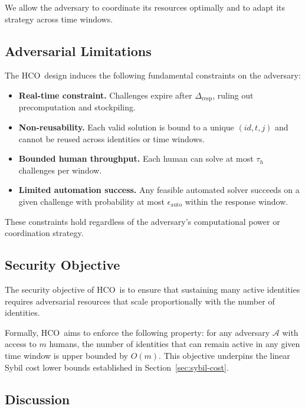 \documentclass[11pt]{article}
\newcommand{\HCO}{HCO\xspace}
\begin{document}
We allow the adversary to coordinate its resources optimally and to adapt its strategy across time windows.

\subsection{Adversarial Limitations}

The \HCO\ design induces the following fundamental constraints on the adversary:
\begin{itemize}
	\item \textbf{Real-time constraint.}
	Challenges expire after $\Delta_{\mathrm{resp}}$, ruling out precomputation and stockpiling.
	
	\item \textbf{Non-reusability.}
	Each valid solution is bound to a unique $(id, t, j)$ and cannot be reused across identities or time windows.
	
	\item \textbf{Bounded human throughput.}
	Each human can solve at most $\tau_h$ challenges per window.
	
	\item \textbf{Limited automation success.}
	Any feasible automated solver succeeds on a given challenge with probability at most $\epsilon_{\mathrm{auto}}$ within the response window.
\end{itemize}

These constraints hold regardless of the adversary’s computational power or coordination strategy.

\subsection{Security Objective}

The security objective of \HCO\ is to ensure that sustaining many active identities requires adversarial resources that scale proportionally with the number of identities.

Formally, \HCO\ aims to enforce the following property: for any adversary $\mathcal{A}$ with access to $m$ humans, the number of identities that can remain active in any given time window is upper bounded by $O(m)$. This objective underpins the linear Sybil cost lower bounds established in Section~\ref{sec:sybil-cost}.

\subsection{Discussion}
\end{document}
